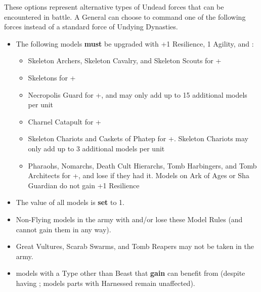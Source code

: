 

These options represent alternative types of Undead forces that can be encountered in battle. A \pharaoh{} General can choose to command one of the following forces instead of a standard force of Undying Dynasties.

\subtitle{\commanderoftheterracottaarmy}

\begin{itemize}
\item The following models \textbf{must} be upgraded with +1 Resilience, \minuss{}1 Agility, and \textbf{\ensouledstatue}:

\begin{itemize}
\item Skeleton Archers, Skeleton Cavalry, and Skeleton Scouts for +\permodel{}
\item Skeletons for +\permodel{}
\item Necropolis Guard for +\permodel{}, and may only add up to 15 additional models per unit
\item Charnel Catapult for +\permodel{}
\item \rnf{} Skeleton Chariots and Caskets of Phatep for +\permodel{}. Skeleton Chariots may only add up to 3 additional models per unit
\item Pharaohs, Nomarchs, Death Cult Hierarchs, Tomb Harbingers, and Tomb Architects for +\permodel{}, and lose \flammable{} if they had it. Models on Ark of Ages or Sha Guardian do not gain +1 Resilience
\end{itemize}

\item The \resurrected{} value of all models is \textbf{set} to 1.

\item Non-Flying models in the army with \undergroundambush{} and/or \lighttroops{} lose these Model Rules (and cannot gain them in any way). 

\item Great Vultures, Scarab Swarms, and Tomb Reapers may not be taken in the army.

\item \rnf{} models with a Type other than Beast that \textbf{gain} \ensouledstatue{} can benefit from \undyingwill{} (despite having \ensouledstatue{}; models parts with Harnessed remain unaffected).
\end{itemize}

\subtitle{\lordofthebarrowlegion}

